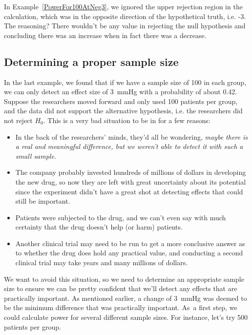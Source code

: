 In Example~\ref{PowerFor100AtNeg3}, we ignored the upper rejection region in the calculation, which was in the opposite direction of the hypothetical truth, i.e. -3. The reasoning? There wouldn't be any value in rejecting the null hypothesis and concluding there was an increase when in fact there was a decrease.


\textC{\newpage}


\subsection{Determining a proper sample size}

In the last example, we found that if we have a sample size of 100 in each group, we can only detect an effect size of 3~mmHg with a probability of about 0.42. Suppose the researchers moved forward and only used 100 patients per group, and the data did not support the alternative hypothesis, i.e. the researchers did not reject $H_0$. This is a very bad situation to be in for a few reasons:
\begin{itemize}
\setlength{\itemsep}{0mm}
\item In the back of the researchers' minds, they'd all be wondering, \emph{maybe there is a real and meaningful difference, but we weren't able to detect it with such a small sample}. 
\item The company probably invested hundreds of millions of dollars in developing the new drug, so now they are left with great uncertainty about its potential since the experiment didn't have a great shot at detecting effects that could still be important.
\item Patients were subjected to the drug, and we can't even say with much certainty that the drug doesn't help (or harm) patients.
\item Another clinical trial may need to be run to get a more conclusive answer as to whether the drug does hold any practical value, and conducting a second clinical trial may take years and many millions of dollars.
\end{itemize}
We want to avoid this situation, so we need to determine an appropriate sample size to ensure we can be pretty confident that we'll detect any effects that are practically important. As mentioned earlier, a change of 3~mmHg was deemed to be the minimum difference that was practically important. As~a first step, we could calculate power for several different sample sizes. For instance, let's try 500 patients per group.

